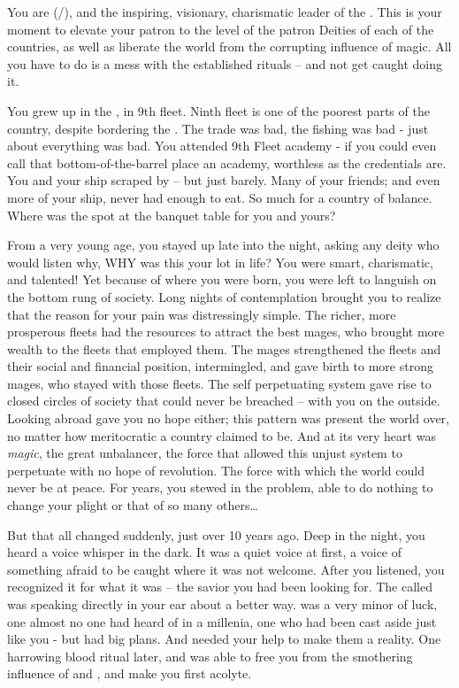\documentclass[char]{GL2020}
\begin{document}
\name{\cChupLeader{}}

You are \cChupLeader{\full} (\cChupLeader{\they}/\cChupLeader{\them}), and the inspiring, visionary, charismatic leader of the \pGoaties{}. This is your moment to elevate your patron \cGenesis{\God} \cGenesis{} to the level of the patron Deities of each of the countries, as well as liberate the world from the corrupting influence of magic. All you have to do is a mess with the established rituals -- and not get caught doing it.

You grew up in the \pShip{}, in 9th fleet. Ninth fleet is one of the poorest parts of the country, despite bordering the \pFarm{}. The trade was bad, the fishing was bad - just about everything was bad. You attended 9th Fleet academy - if you could even call that bottom-of-the-barrel place an academy, worthless as the credentials are. You and your ship scraped by -- but just barely. Many of your friends; and even more of your ship, never had enough to eat. So much for a country of balance. Where was the spot at the banquet table for you and yours?

From a very young age, you stayed up late into the night, asking any deity who would listen why, WHY was this your lot in life? You were smart, charismatic, and talented! Yet because of where you were born, you were left to languish on the bottom rung of society. Long nights of contemplation brought you to realize that the reason for your pain was distressingly simple. The richer, more prosperous fleets had the resources to attract the best mages, who brought more wealth to the fleets that employed them. The mages strengthened the fleets and their social and financial position, intermingled, and gave birth to more strong mages, who stayed with those fleets. The self perpetuating system gave rise to closed circles of society that could never be breached -- with you on the outside. Looking abroad gave you no hope either; this pattern was present the world over, no matter how meritocratic a country claimed to be. And at its very heart was \emph{magic}, the great unbalancer, the force that allowed this unjust system to perpetuate with no hope of revolution. The force with which the world could never be at peace. For years, you stewed in the problem, able to do nothing to change your plight or that of so many others\ldots{}

But that all changed suddenly, just over 10 years ago. Deep in the night, you heard a voice whisper in the dark. It was a quiet voice at first, a voice of something afraid to be caught where it was not welcome. After you listened, you recognized it for what it was -- the savior you had been looking for. The \cGenesis{\God} called \cGenesis{} was speaking directly in your ear about a better way. \cGenesis{} was a very minor \cGenesis{\God} of luck, one almost no one had heard of in a millenia, one who had been cast aside just like you - but \cGenesis{} had big plans. And \cGenesis{\they} needed your help to make them a reality. One harrowing blood ritual later, and \cGenesis{} was able to free you from the smothering influence of \cEbb{} and \cFlow{}, and make you \cGenesis{\their} first acolyte.
\end{document}
